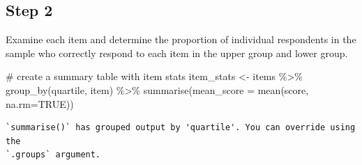 \documentclass[
  letterpaper,
  DIV=11,
  numbers=noendperiod]{scrreprt}
\newenvironment{Shaded}{\begin{snugshade}}{\end{snugshade}}
\newcommand{\AttributeTok}[1]{\textcolor[rgb]{0.40,0.45,0.13}{#1}}
\newcommand{\CommentTok}[1]{\textcolor[rgb]{0.37,0.37,0.37}{#1}}
\newcommand{\ConstantTok}[1]{\textcolor[rgb]{0.56,0.35,0.01}{#1}}
\newcommand{\FunctionTok}[1]{\textcolor[rgb]{0.28,0.35,0.67}{#1}}
\newcommand{\NormalTok}[1]{\textcolor[rgb]{0.00,0.23,0.31}{#1}}
\newcommand{\OtherTok}[1]{\textcolor[rgb]{0.00,0.23,0.31}{#1}}
\newcommand{\SpecialCharTok}[1]{\textcolor[rgb]{0.37,0.37,0.37}{#1}}
\begin{document}
\hypertarget{step-2}{%
\subsection{Step 2}\label{step-2}}

Examine each item and determine the proportion of individual respondents
in the sample who correctly respond to each item in the upper group and
lower group.

\begin{Shaded}
\begin{Highlighting}[]
\CommentTok{\# create a summary table with item stats}
\NormalTok{item\_stats }\OtherTok{\textless{}{-}}\NormalTok{ items }\SpecialCharTok{\%\textgreater{}\%} 
  \FunctionTok{group\_by}\NormalTok{(quartile, item) }\SpecialCharTok{\%\textgreater{}\%}
  \FunctionTok{summarise}\NormalTok{(}\AttributeTok{mean\_score =} \FunctionTok{mean}\NormalTok{(score, }\AttributeTok{na.rm=}\ConstantTok{TRUE}\NormalTok{))}
\end{Highlighting}
\end{Shaded}

\begin{verbatim}
`summarise()` has grouped output by 'quartile'. You can override using the
`.groups` argument.
\end{verbatim}
\end{document}
